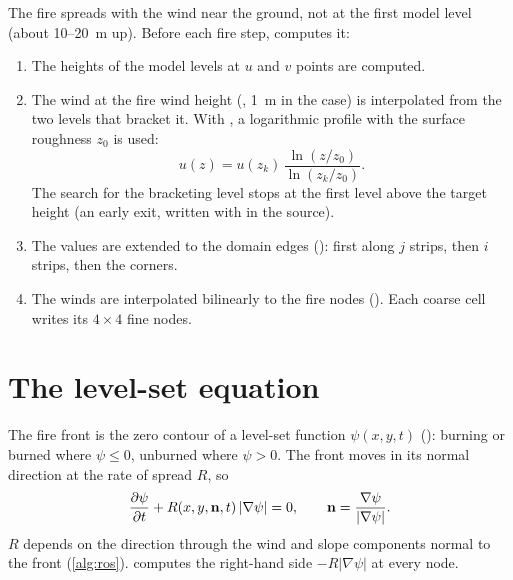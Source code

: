 The fire spreads with the wind near the ground, not at the first model level (about 10--20~m up). Before each fire
step,  computes it:
\begin{enumerate}
  \item The heights of the model levels at $u$ and $v$ points are computed.
  \item The wind at the fire wind height (, 1~m in the case) is interpolated from the two
    levels that bracket it. With , a logarithmic profile with the surface roughness
    $z_0$ is used:
    \begin{equation}
      u(z) = u(z_k)\,\frac{\ln(z/z_0)}{\ln(z_k/z_0)} .
    \end{equation}
    The search for the bracketing level stops at the first level above the target height (an early exit, written with
     in the source).
  \item The values are extended to the domain edges (): first
    along $j$ strips, then $i$ strips, then the corners.
  \item The winds are interpolated bilinearly to the fire nodes ().
    Each coarse cell writes its $4\times4$ fine nodes.
\end{enumerate}

\section{The level-set equation}

The fire front is the zero contour of a level-set function $\psi(x, y, t)$ (): burning or burned where
$\psi \le 0$, unburned where $\psi > 0$. The front moves in its normal direction at the rate of spread $R$, so
\begin{equation}
  \frac{\partial \psi}{\partial t} + R(x, y, \mathbf{n}, t)\,|\nabla\psi| = 0, \qquad \mathbf{n} = \frac{\nabla\psi}{|\nabla\psi|} .
  \label{eq:levelset}
\end{equation}
$R$ depends on the direction through the wind and slope components normal to the front (\cref{alg:ros}).
 computes the right-hand side $-R|\nabla\psi|$ at every node.

